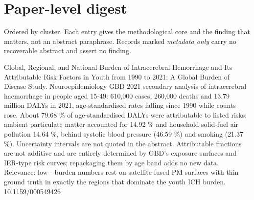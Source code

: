 \documentclass[10pt]{article}
\providecommand{\FIGDIR}{fig}
\begin{document}
\IfFileExists{\FIGDIR/extra_figs.tex}{}{}



\par{}\baselineskip{}\baselineskip
\section*{\sffamily\bfseries\color{Deep}Paper-level digest}
\vspace{-1.5mm}{\color{Amber}\rule{\linewidth}{1.1pt}}\vspace{2.5mm}

{\fontsize{7.4}{9}\selectfont\color{Slate}Ordered by cluster. Each entry gives the
methodological core and the finding that matters, not an abstract paraphrase. Records
marked \textit{metadata only} carry no recoverable abstract and assert no finding.\par}


{Global, Regional, and National Burden of Intracerebral Hemorrhage and Its Attributable Risk Factors in Youth from 1990 to 2021: A Global Burden of Disease Study.}
{Neuroepidemiology}
{GBD 2021 secondary analysis of intracerebral haemorrhage in people aged 15-49: 610,000 cases, 260,000 deaths and 13.79 million DALYs in 2021, age-standardised rates falling since 1990 while counts rose. About 79.68 \% of age-standardised DALYs were attributable to listed risks; ambient particulate matter accounted for 14.92 \% and household solid-fuel air pollution 14.64 \%, behind systolic blood pressure (46.59 \%) and smoking (21.37 \%). Uncertainty intervals are not quoted in the abstract. Attributable fractions are not additive and are entirely determined by GBD's exposure surfaces and IER-type risk curves; repackaging them by age band adds no new data. Relevance: low - burden numbers rest on satellite-fused PM surfaces with thin ground truth in exactly the regions that dominate the youth ICH burden.}
{10.1159/000549426}

\par{}\baselineskip{}\baselineskip
{}
\end{document}

